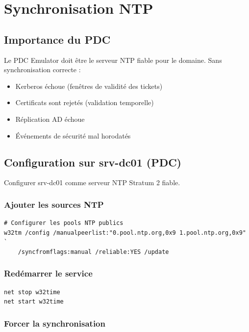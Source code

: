 \chapter{Synchronisation NTP}

\section{Importance du PDC}

Le PDC Emulator doit être le serveur NTP fiable pour le domaine. Sans synchronisation correcte :

\begin{itemize}
    \item Kerberos échoue (fenêtres de validité des tickets)
    \item Certificats sont rejetés (validation temporelle)
    \item Réplication AD échoue
    \item Événements de sécurité mal horodatés
\end{itemize}

\section{Configuration sur srv-dc01 (PDC)}

Configurer srv-dc01 comme serveur NTP Stratum 2 fiable.

\subsection{Ajouter les sources NTP}

\begin{lstlisting}[style=powershell]
# Configurer les pools NTP publics
w32tm /config /manualpeerlist:"0.pool.ntp.org,0x9 1.pool.ntp.org,0x9" `
    /syncfromflags:manual /reliable:YES /update
\end{lstlisting}

\subsection{Redémarrer le service}

\begin{lstlisting}[style=powershell]
net stop w32time
net start w32time
\end{lstlisting}

\subsection{Forcer la synchronisation}

